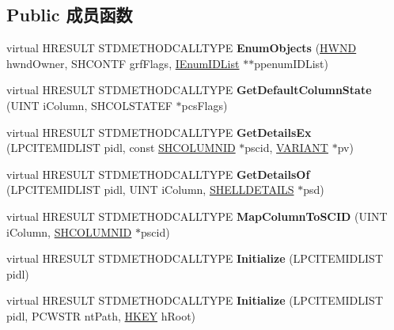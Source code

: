 \subsection*{Public 成员函数}
\begin{DoxyCompactItemize}
\item 
\mbox{\label{class_c_registry_folder_a4041cd8f4616b59347737c4c0af880e5}} 
virtual H\+R\+E\+S\+U\+LT S\+T\+D\+M\+E\+T\+H\+O\+D\+C\+A\+L\+L\+T\+Y\+PE {\bfseries Enum\+Objects} (\hyperlink{interfacevoid}{H\+W\+ND} hwnd\+Owner, S\+H\+C\+O\+N\+TF grf\+Flags, \hyperlink{interface_i_enum_i_d_list}{I\+Enum\+I\+D\+List} $\ast$$\ast$ppenum\+I\+D\+List)
\item 
\mbox{\label{class_c_registry_folder_a5483b6b93599e08fc478d7762cc1651d}} 
virtual H\+R\+E\+S\+U\+LT S\+T\+D\+M\+E\+T\+H\+O\+D\+C\+A\+L\+L\+T\+Y\+PE {\bfseries Get\+Default\+Column\+State} (U\+I\+NT i\+Column, S\+H\+C\+O\+L\+S\+T\+A\+T\+EF $\ast$pcs\+Flags)
\item 
\mbox{\label{class_c_registry_folder_a1e3b27ad55d5a1badb8db0aba76583bf}} 
virtual H\+R\+E\+S\+U\+LT S\+T\+D\+M\+E\+T\+H\+O\+D\+C\+A\+L\+L\+T\+Y\+PE {\bfseries Get\+Details\+Ex} (L\+P\+C\+I\+T\+E\+M\+I\+D\+L\+I\+ST pidl, const \hyperlink{struct_i_shell_folder2_1_1_s_h_c_o_l_u_m_n_i_d}{S\+H\+C\+O\+L\+U\+M\+N\+ID} $\ast$pscid, \hyperlink{structtag_v_a_r_i_a_n_t}{V\+A\+R\+I\+A\+NT} $\ast$pv)
\item 
\mbox{\label{class_c_registry_folder_a628fd4d9839240e7f95accc6230563e1}} 
virtual H\+R\+E\+S\+U\+LT S\+T\+D\+M\+E\+T\+H\+O\+D\+C\+A\+L\+L\+T\+Y\+PE {\bfseries Get\+Details\+Of} (L\+P\+C\+I\+T\+E\+M\+I\+D\+L\+I\+ST pidl, U\+I\+NT i\+Column, \hyperlink{struct_s_h_e_l_l_d_e_t_a_i_l_s}{S\+H\+E\+L\+L\+D\+E\+T\+A\+I\+LS} $\ast$psd)
\item 
\mbox{\label{class_c_registry_folder_a2842cba6a745e465333d426c191163c0}} 
virtual H\+R\+E\+S\+U\+LT S\+T\+D\+M\+E\+T\+H\+O\+D\+C\+A\+L\+L\+T\+Y\+PE {\bfseries Map\+Column\+To\+S\+C\+ID} (U\+I\+NT i\+Column, \hyperlink{struct_i_shell_folder2_1_1_s_h_c_o_l_u_m_n_i_d}{S\+H\+C\+O\+L\+U\+M\+N\+ID} $\ast$pscid)
\item 
\mbox{\label{class_c_registry_folder_ab703016d65f133b81e9206ae221897bf}} 
virtual H\+R\+E\+S\+U\+LT S\+T\+D\+M\+E\+T\+H\+O\+D\+C\+A\+L\+L\+T\+Y\+PE {\bfseries Initialize} (L\+P\+C\+I\+T\+E\+M\+I\+D\+L\+I\+ST pidl)
\item 
\mbox{\label{class_c_registry_folder_a219f9e694908753564aaa6c1bf3c107c}} 
virtual H\+R\+E\+S\+U\+LT S\+T\+D\+M\+E\+T\+H\+O\+D\+C\+A\+L\+L\+T\+Y\+PE {\bfseries Initialize} (L\+P\+C\+I\+T\+E\+M\+I\+D\+L\+I\+ST pidl, P\+C\+W\+S\+TR nt\+Path, \hyperlink{interfacevoid}{H\+K\+EY} h\+Root)
\end{DoxyCompactItemize}
